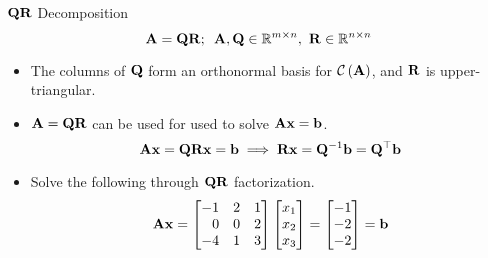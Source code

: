 \documentclass[aspectratio=169]{beamer}
\let\olditem\item
\renewcommand{\item}{\setlength{\itemsep}{\fill}\olditem}
\def\mf{\ensuremath\mathbf}
\def\mb{\ensuremath\mathbb}
\def\mc{\ensuremath\mathcal}
\def\lp{\ensuremath\left(}
\def\rp{\ensuremath\right)}
\begin{document}
\begin{frame}[t]{$\mf{QR}$ Decomposition}
$$\mf{A} = \mf{QR}; \,\,\, \mf{A}, \mf{Q} \in \mb{R}^{m \times n},\,\, \mf{R} \in \mb{R}^{n \times n}$$
\begin{itemize}
    \item The columns of $\mf{Q}$ form an orthonormal basis for $\mc{C}\lp \mf{A}\rp$, and $\mf{R}$ is upper-triangular.
    \item $\mf{A} = \mf{QR}$ can be used for used to solve $\mf{Ax} = \mf{b}$.
    \[ \mf{Ax} = \mf{QRx} = \mf{b} \implies \mf{Rx} = \mf{Q}^{-1}\mf{b} = \mf{Q}^\top\mf{b} \]

    \item {\color{blue} Solve the following through $\mf{QR}$ factorization. 
    $$\mf{Ax} = \begin{bmatrix*}[r]
    -1 & 2 & 1\\
     0 & 0 & 2\\
    -4 & 1 & 3\\
    \end{bmatrix*}\begin{bmatrix*}[r]
    x_1\\
    x_2\\
    x_3\\
    \end{bmatrix*} = \begin{bmatrix*}[r]
    -1\\
    -2\\
    -2\\
    \end{bmatrix*} = \mf{b}$$}
\end{itemize}
\end{frame}
\end{document}
